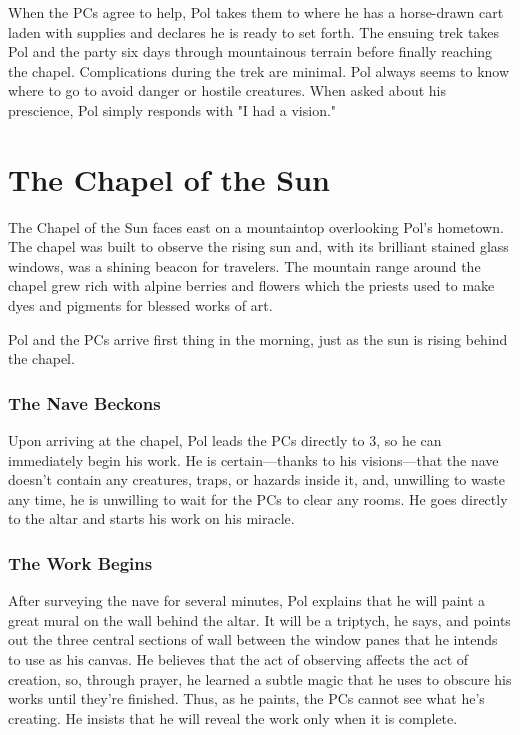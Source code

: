 \documentclass[10pt,a4paper,twoside,bg=print,twocolumn,openany,nodeprecatedcode]{dndbook}
\begin{document}
When the PCs agree to help, Pol takes them to where he has a horse-drawn cart laden with supplies and declares he is ready to set forth. The ensuing trek takes Pol and the party six days through mountainous terrain before finally reaching the chapel. Complications during the trek are minimal. Pol always seems to know where to go to avoid danger or hostile creatures. When asked about his prescience, Pol simply responds with "I had a vision."

\section{The Chapel of the Sun}
The Chapel of the Sun faces east on a mountaintop overlooking Pol's hometown. The chapel was built to observe the rising sun and, with its brilliant stained glass windows, was a shining beacon for travelers. The mountain range around the chapel grew rich with alpine berries and flowers which the priests used to make dyes and pigments for blessed works of art.

Pol and the PCs arrive first thing in the morning, just as the sun is rising behind the chapel.

\subsubsection{The Nave Beckons}
Upon arriving at the chapel, Pol leads the PCs directly to 3, so he can immediately begin his work. He is certain—thanks to his visions—that the nave doesn't contain any creatures, traps, or hazards inside it, and, unwilling to waste any time, he is unwilling to wait for the PCs to clear any rooms. He goes directly to the altar and starts his work on his miracle.

\subsubsection{The Work Begins}
After surveying the nave for several minutes, Pol explains that he will paint a great mural on the wall behind the altar. It will be a triptych, he says, and points out the three central sections of wall between the window panes that he intends to use as his canvas. He believes that the act of observing affects the act of creation, so, through prayer, he learned a subtle magic that he uses to obscure his works until they're finished. Thus, as he paints, the PCs cannot see what he's creating. He insists that he will reveal the work only when it is complete.
\end{document}
